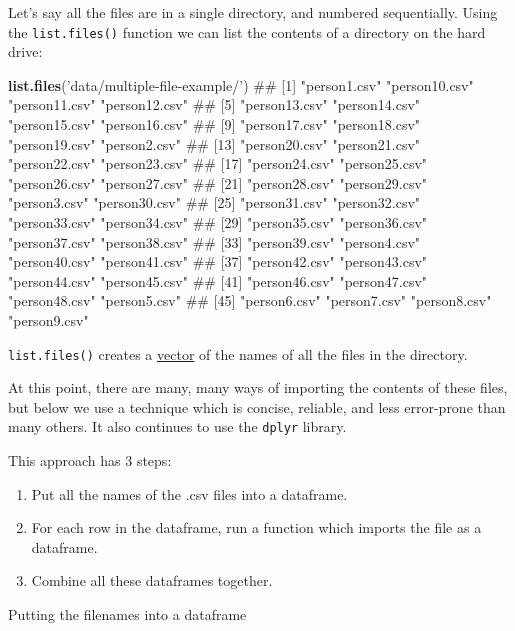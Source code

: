 \documentclass[]{article}
\newenvironment{Shaded}{\begin{snugshade}}{\end{snugshade}}
\newcommand{\KeywordTok}[1]{\textcolor[rgb]{0.13,0.29,0.53}{\textbf{#1}}}
\newcommand{\StringTok}[1]{\textcolor[rgb]{0.31,0.60,0.02}{#1}}
\newcommand{\NormalTok}[1]{#1}
\providecommand{\tightlist}{%
  \setlength{\itemsep}{0pt}\setlength{\parskip}{0pt}}
\theoremstyle{definition}
\theoremstyle{definition}
\theoremstyle{definition}
\theoremstyle{remark}
\begin{document}
Let's say all the files are in a single directory, and numbered
sequentially. Using the \texttt{list.files()} function we can list the
contents of a directory on the hard drive:

\begin{Shaded}
\begin{Highlighting}[]
\KeywordTok{list.files}\NormalTok{(}\StringTok{'data/multiple-file-example/'}\NormalTok{)}
\NormalTok{##  [1] "person1.csv"  "person10.csv" "person11.csv" "person12.csv"}
\NormalTok{##  [5] "person13.csv" "person14.csv" "person15.csv" "person16.csv"}
\NormalTok{##  [9] "person17.csv" "person18.csv" "person19.csv" "person2.csv" }
\NormalTok{## [13] "person20.csv" "person21.csv" "person22.csv" "person23.csv"}
\NormalTok{## [17] "person24.csv" "person25.csv" "person26.csv" "person27.csv"}
\NormalTok{## [21] "person28.csv" "person29.csv" "person3.csv"  "person30.csv"}
\NormalTok{## [25] "person31.csv" "person32.csv" "person33.csv" "person34.csv"}
\NormalTok{## [29] "person35.csv" "person36.csv" "person37.csv" "person38.csv"}
\NormalTok{## [33] "person39.csv" "person4.csv"  "person40.csv" "person41.csv"}
\NormalTok{## [37] "person42.csv" "person43.csv" "person44.csv" "person45.csv"}
\NormalTok{## [41] "person46.csv" "person47.csv" "person48.csv" "person5.csv" }
\NormalTok{## [45] "person6.csv"  "person7.csv"  "person8.csv"  "person9.csv"}
\end{Highlighting}
\end{Shaded}

\texttt{list.files()} creates a \protect\hyperlink{vectors}{vector} of
the names of all the files in the directory.

At this point, there are many, many ways of importing the contents of
these files, but below we use a technique which is concise, reliable,
and less error-prone than many others. It also continues to use the
\texttt{dplyr} library.

This approach has 3 steps:

\begin{enumerate}
\def\labelenumi{\arabic{enumi}.}
\tightlist
\item
  Put all the names of the .csv files into a dataframe.
\item
  For each row in the dataframe, run a function which imports the file
  as a dataframe.
\item
  Combine all these dataframes together.
\end{enumerate}

Putting the filenames into a dataframe
\end{document}
